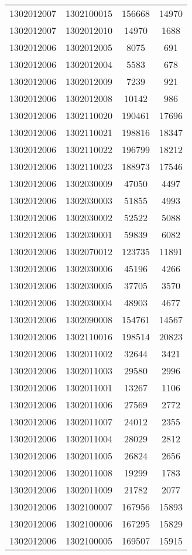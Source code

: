 \begin{longtable}{llcc}
1302012007 & 1302100015 & 156668 & 14970\\
1302012007 & 1302012010 & 14970 & 1688\\
1302012006 & 1302012005 & 8075 & 691\\
1302012006 & 1302012004 & 5583 & 678\\
1302012006 & 1302012009 & 7239 & 921\\
1302012006 & 1302012008 & 10142 & 986\\
1302012006 & 1302110020 & 190461 & 17696\\
1302012006 & 1302110021 & 198816 & 18347\\
1302012006 & 1302110022 & 196799 & 18212\\
1302012006 & 1302110023 & 188973 & 17546\\
1302012006 & 1302030009 & 47050 & 4497\\
1302012006 & 1302030003 & 51855 & 4993\\
1302012006 & 1302030002 & 52522 & 5088\\
1302012006 & 1302030001 & 59839 & 6082\\
1302012006 & 1302070012 & 123735 & 11891\\
1302012006 & 1302030006 & 45196 & 4266\\
1302012006 & 1302030005 & 37705 & 3570\\
1302012006 & 1302030004 & 48903 & 4677\\
1302012006 & 1302090008 & 154761 & 14567\\
1302012006 & 1302110016 & 198514 & 20823\\
1302012006 & 1302011002 & 32644 & 3421\\
1302012006 & 1302011003 & 29580 & 2996\\
1302012006 & 1302011001 & 13267 & 1106\\
1302012006 & 1302011006 & 27569 & 2772\\
1302012006 & 1302011007 & 24012 & 2355\\
1302012006 & 1302011004 & 28029 & 2812\\
1302012006 & 1302011005 & 26824 & 2656\\
1302012006 & 1302011008 & 19299 & 1783\\
1302012006 & 1302011009 & 21782 & 2077\\
1302012006 & 1302100007 & 167956 & 15893\\
1302012006 & 1302100006 & 167295 & 15829\\
1302012006 & 1302100005 & 169507 & 15915\\

\end{longtable}
